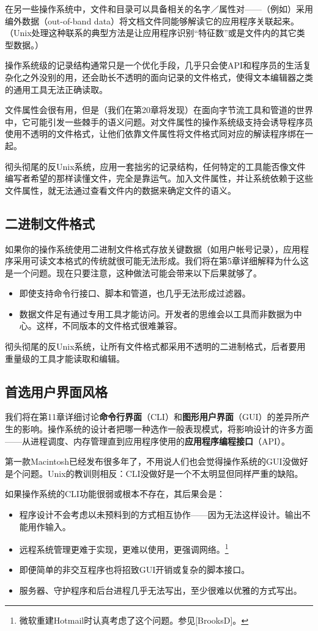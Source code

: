 \documentclass[11pt,oneside]{book}
\begin{document}
\begin{common-format}
在另一些操作系统中，文件和目录可以具备相关的名字／属性对——（例如）采用编外数据（out-of-band data）将文档文件同能够解读它的应用程序关联起来。（Unix处理这种联系的典型方法是让应用程序识别“特征数”或是文件内的其它类型数据。）

操作系统级的记录结构通常只是一个优化手段，几乎只会使API和程序员的生活复杂化之外没别的用，还会助长不透明的面向记录的文件格式，使得文本编辑器之类的通用工具无法正确读取。

文件属性会很有用，但是（我们在第20章将发现）在面向字节流工具和管道的世界中，它可能引发一些棘手的语义问题。对文件属性的操作系统级支持会诱导程序员使用不透明的文件格式，让他们依靠文件属性将文件格式同对应的解读程序绑在一起。

彻头彻尾的反Unix系统，应用一套拙劣的记录结构，任何特定的工具能否像文件编写者希望的那样读懂文件，完全是靠运气。加入文件属性，并让系统依赖于这些文件属性，就无法通过查看文件内的数据来确定文件的语义。

\subsection{二进制文件格式}
如果你的操作系统使用二进制文件格式存放关键数据（如用户帐号记录），应用程序采用可读文本格式的传统就很可能无法形成。我们将在第5章详细解释为什么这是一个问题。现在只要注意，这种做法可能会带来以下后果就够了。

\begin{itemize}
\item 即使支持命令行接口、脚本和管道，也几乎无法形成过滤器。
\item 数据文件足有通过专用工具才能访问。开发者的思维会以工具而非数据为中心。这样，不同版本的文件格式很难兼容。
\end{itemize}

彻头彻尾的反Unix系统，让所有文件格式都采用不透明的二进制格式，后者要用重量级的工具才能读取和编辑。

\subsection{首选用户界面风格}
我们将在第11章详细讨论\textbf{命令行界面}（CLI）和\textbf{图形用户界面}（GUI）的差异所产生的影响。操作系统的设计者把哪一种选作一般表现模式，将影响设计的许多方面——从进程调度、内存管理直到应用程序使用的\textbf{应用程序编程接口}（API）。

第一款Macintosh已经发布很多年了，不用说人们也会觉得操作系统的GUI没做好是个问题。Unix的教训则相反：CLI没做好是一个不太明显但同样严重的缺陷。

如果操作系统的CLI功能很弱或根本不存在，其后果会是：
\begin{itemize}
\item 程序设计不会考虑以未预料到的方式相互协作——因为无法这样设计。输出不能用作输入。
\item 远程系统管理更难于实现，更难以使用，更强调网络。\footnote{微软重建Hotmail时认真考虑了这个问题。参见[BrooksD]。}
\item 即便简单的非交互程序也将招致GUI开销或复杂的脚本接口。
\item 服务器、守护程序和后台进程几乎无法写出，至少很难以优雅的方式写出。
\end{itemize}


\end{common-format}
\end{document}
